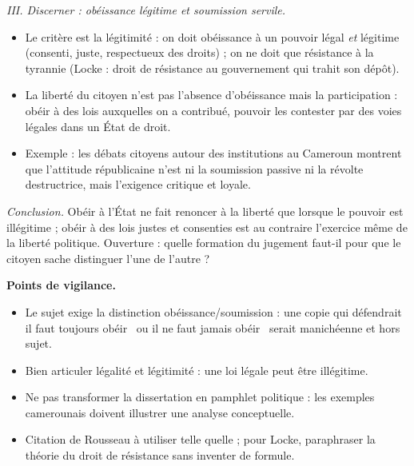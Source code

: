 \documentclass[11pt]{article}
\begin{document}
\begin{corrige}
\emph{III. Discerner : obéissance légitime et soumission servile.}
\begin{itemize}
\item Le critère est la légitimité : on doit obéissance à un pouvoir légal \emph{et} légitime (consenti, juste, respectueux des droits) ; on ne doit que résistance à la tyrannie (Locke : droit de résistance au gouvernement qui trahit son dépôt).
\item La liberté du citoyen n'est pas l'absence d'obéissance mais la participation : obéir à des lois auxquelles on a contribué, pouvoir les contester par des voies légales dans un État de droit.
\item Exemple : les débats citoyens autour des institutions au Cameroun montrent que l'attitude républicaine n'est ni la soumission passive ni la révolte destructrice, mais l'exigence critique et loyale.
\end{itemize}

\emph{Conclusion.} Obéir à l'État ne fait renoncer à la liberté que lorsque le pouvoir est illégitime ; obéir à des lois justes et consenties est au contraire l'exercice même de la liberté politique. Ouverture : quelle formation du jugement faut-il pour que le citoyen sache distinguer l'une de l'autre ?

\textbf{Points de vigilance.}
\begin{itemize}
\item Le sujet exige la distinction obéissance/soumission : une copie qui défendrait \guillemotleft il faut toujours obéir \guillemotright\ ou \guillemotleft il ne faut jamais obéir \guillemotright\ serait manichéenne et hors sujet.
\item Bien articuler légalité et légitimité : une loi légale peut être illégitime.
\item Ne pas transformer la dissertation en pamphlet politique : les exemples camerounais doivent illustrer une analyse conceptuelle.
\item Citation de Rousseau à utiliser telle quelle ; pour Locke, paraphraser la théorie du droit de résistance sans inventer de formule.
\end{itemize}

\end{corrige}
\end{document}
